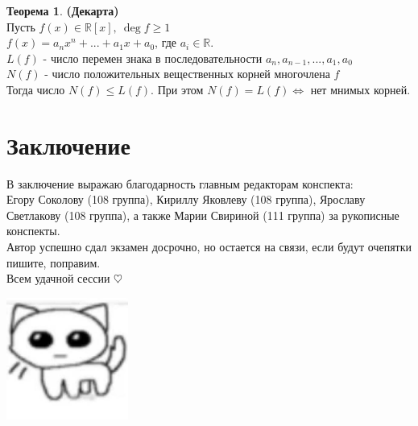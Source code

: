 \documentclass[a4paper, 12pt]{article}
\newcommand{\R}{\mathbb R}
\theoremstyle{definition}
\newtheorem*{theorem}{Теорема}
\begin{document}
  \begin{theorem} \textbf{(Декарта)}\\ 
    Пусть $f(x) \in \R [x], \ \deg f \geq 1$\\
    $f(x) = a_nx^n + ... + a_1x + a_0$, где $a_i \in \R.$\\
    $L(f)$ - число перемен знака в последовательности $a_n, a_{n-1},...,a_1,a_0$\\ 
    $N(f)$ - число положительных вещественных корней многочлена $f$\\
    Тогда число $N(f) \leq L(f)$. При этом $N(f) = L(f) \Longleftrightarrow $ нет мнимых корней.   
  \end{theorem} 
  \newpage

  \section*{Заключение}
  В заключение выражаю благодарность главным редакторам конспекта: \\Егору Соколову (108 группа), Кириллу Яковлеву (108 группа), Ярославу Светлакову (108 группа), а также Марии Свириной (111 группа) за рукописные конспекты.\\
  Автор успешно сдал экзамен досрочно, но остается на связи, если будут очепятки пишите, поправим. \\
  Всем удачной сессии $\heartsuit$ 

  \begin{center}
    \includegraphics[width=4cm]{kotik.jpg}
  \end{center}



  


\end{document}
